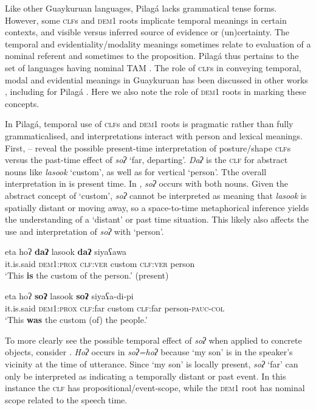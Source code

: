 \documentclass[output=paper,colorlinks,citecolor=brown]{langscibook}
\begin{document}
Like other Guaykuruan languages, Pilagá lacks grammatical tense forms. However, some \textsc{clf}s and \textsc{dem1} roots implicate temporal meanings in certain contexts, and visible versus inferred source of evidence or (un)certainty. The temporal and evidentiality/modality meanings sometimes relate to evaluation of a nominal referent and sometimes to the proposition. Pilagá thus pertains to the set of languages having nominal TAM \citep{NordlingerSadler2004}. The role of \textsc{clf}s in conveying temporal, modal and evidential meanings in Guaykuruan has been discussed in other works \citep{MessineoEtAl2016,MessineoCúneo2019}, including for Pilagá \citep{VidalKlein1998,VidalGutiérrez2010}. Here we also note the role of \textsc{dem1} roots in marking these concepts.

In Pilagá, temporal use of \textsc{clf}s and \textsc{dem1} roots is pragmatic rather than fully grammaticalised, and interpretations interact with person and lexical meanings. First, – reveal the possible present-time interpretation of posture/shape \textsc{clf}s versus the past-time effect of \textit{soʔ} ‘far, departing’. \textit{Daʔ} is the \textsc{clf} for abstract nouns like \textit{lasook} ‘custom’, as well as for vertical ‘person’. Tthe overall interpretation in  is present time. In , \textit{soʔ} occurs with both nouns. Given the abstract concept of ‘custom’, \textit{soʔ} cannot be interpreted as meaning that \textit{lasook} is spatially distant or moving away, so a space-to-time metaphorical inference yields the understanding of a ‘distant’ or past time situation. This likely also affects the use and interpretation of \textit{soʔ} with ‘person’.

\ea\label{ex:payne:74}
\gll  eta hoʔ  \textbf{daʔ}  lasook  \textbf{daʔ}  siyaʕawa\\
it.is.said \textsc{dem1:prox}  \textsc{clf:ver} custom \textsc{clf:ver} person\\
\glt ‘This \textbf{is} the custom of the person.’ (present)
\z

\ea\label{ex:payne:75}
\gll  eta  hoʔ  \textbf{soʔ}  lasook  \textbf{soʔ}  siyaʕa-di-pi\\
it.is.said  \textsc{dem1:prox}  \textsc{clf}:far  custom \textsc{clf}:far  person-\textsc{pauc-col}\\
\glt ‘This \textbf{was} the custom (of) the people.’
\z

To more clearly see the possible temporal effect of \textit{soʔ} when applied to concrete objects, consider . \textit{Hoʔ} occurs in \textit{soʔ=hoʔ} because ‘my son’ is in the speaker’s vicinity at the time of utterance. Since ‘my son’ is locally present, \textit{soʔ} ‘far’ can only be interpreted as indicating a temporally distant or past event. In this instance the \textsc{clf} has propositional/event-scope, while the \textsc{dem1} root has nominal scope related to the speech time.
\end{document}
